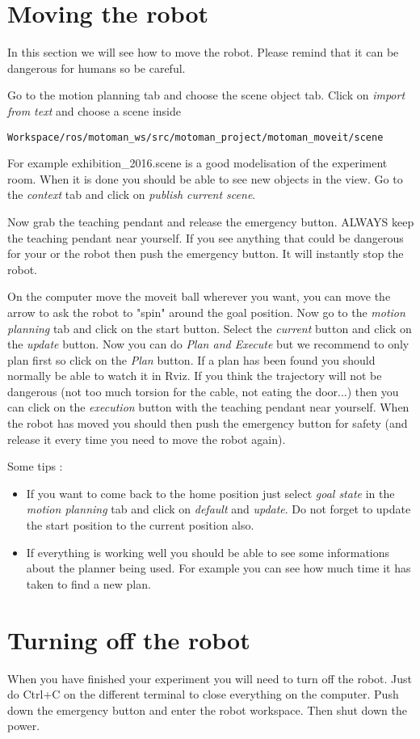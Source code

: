 \section{Moving the robot}

In this section we will see how to move the robot. Please remind that it can be dangerous for humans so be careful.

Go to the motion planning tab and choose the scene object tab. Click on \emph{import from text} and choose a scene inside 

\begin{lstlisting}
Workspace/ros/motoman_ws/src/motoman_project/motoman_moveit/scene
\end{lstlisting} 
For example exhibition\_2016.scene is a good modelisation of the experiment room. When it is done you should be able to see new objects in the view. Go to the \emph{context} tab and click on \emph{publish current scene}.

Now grab the teaching pendant and release the emergency button. ALWAYS keep the teaching pendant near yourself. If you see anything that could be dangerous for your or the robot then push the emergency button. It will instantly stop the robot.

On the computer move the moveit ball wherever you want, you can move the arrow to ask the robot to "spin" around the goal position. Now go to the \emph{motion planning} tab and click on the start button. Select the \emph{current} button and click on the \emph{update} button. Now you can do \emph{Plan and Execute} but we recommend to only plan first so click on the \emph{Plan} button. If a plan has been found you should normally be able to watch it in Rviz. If you think the trajectory will not be dangerous (not too much torsion for the cable, not eating the door...) then you can click on the \emph{execution} button with the teaching pendant near yourself. When the robot has moved you should then push the emergency button for safety (and release it every time you need to move the robot again).

Some tips :


\begin{itemize}
\item If you want to come back to the home position just select \emph{goal state} in the \emph{motion planning} tab and click on \emph{default} and \emph{update}. Do not forget to update the start position to the current position also.

\item If everything is working well you should be able to see some informations about the planner being used. For example you can see how much time it has taken to find a new plan.
\end{itemize}

\section{Turning off the robot}

When you have finished your experiment you will need to turn off the robot. Just do Ctrl+C on the different terminal to close everything on the computer. Push down the emergency button and enter the robot workspace. Then shut down the power. 

 
